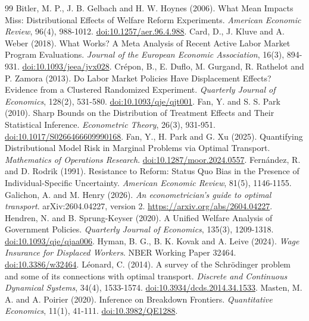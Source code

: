 \documentclass[11pt,a4paper]{article}
\begin{document}
\begin{thebibliography}{99}
\small
{} Bitler, M. P., J. B. Gelbach and H. W. Hoynes (2006). What Mean Impacts Miss: Distributional Effects of Welfare Reform Experiments. \emph{American Economic Review}, 96(4), 988-1012. \href{https://doi.org/10.1257/aer.96.4.988}{doi:10.1257/aer.96.4.988}.
 Card, D., J. Kluve and A. Weber (2018). What Works? A Meta Analysis of Recent Active Labor Market Program Evaluations. \emph{Journal of the European Economic Association}, 16(3), 894-931. \href{https://doi.org/10.1093/jeea/jvx028}{doi:10.1093/jeea/jvx028}.
 Crépon, B., E. Duflo, M. Gurgand, R. Rathelot and P. Zamora (2013). Do Labor Market Policies Have Displacement Effects? Evidence from a Clustered Randomized Experiment. \emph{Quarterly Journal of Economics}, 128(2), 531-580. \href{https://doi.org/10.1093/qje/qjt001}{doi:10.1093/qje/qjt001}.
 Fan, Y. and S. S. Park (2010). Sharp Bounds on the Distribution of Treatment Effects and Their Statistical Inference. \emph{Econometric Theory}, 26(3), 931-951. \href{https://doi.org/10.1017/S0266466609990168}{doi:10.1017/S0266466609990168}.
 Fan, Y., H. Park and G. Xu (2025). Quantifying Distributional Model Risk in Marginal Problems via Optimal Transport. \emph{Mathematics of Operations Research}. \href{https://doi.org/10.1287/moor.2024.0557}{doi:10.1287/moor.2024.0557}.
 Fernández, R. and D. Rodrik (1991). Resistance to Reform: Status Quo Bias in the Presence of Individual-Specific Uncertainty. \emph{American Economic Review}, 81(5), 1146-1155.
 Galichon, A. and M. Henry (2026). \emph{An econometrician's guide to optimal transport}. arXiv:2604.04227, version 2. \url{https://arxiv.org/abs/2604.04227}.
 Hendren, N. and B. Sprung-Keyser (2020). A Unified Welfare Analysis of Government Policies. \emph{Quarterly Journal of Economics}, 135(3), 1209-1318. \href{https://doi.org/10.1093/qje/qjaa006}{doi:10.1093/qje/qjaa006}.
 Hyman, B. G., B. K. Kovak and A. Leive (2024). \emph{Wage Insurance for Displaced Workers}. NBER Working Paper 32464. \href{https://doi.org/10.3386/w32464}{doi:10.3386/w32464}.
 Léonard, C. (2014). A survey of the Schrödinger problem and some of its connections with optimal transport. \emph{Discrete and Continuous Dynamical Systems}, 34(4), 1533-1574. \href{https://doi.org/10.3934/dcds.2014.34.1533}{doi:10.3934/dcds.2014.34.1533}.
 Masten, M. A. and A. Poirier (2020). Inference on Breakdown Frontiers. \emph{Quantitative Economics}, 11(1), 41-111. \href{https://doi.org/10.3982/QE1288}{doi:10.3982/QE1288}.

\end{thebibliography}
\end{document}
